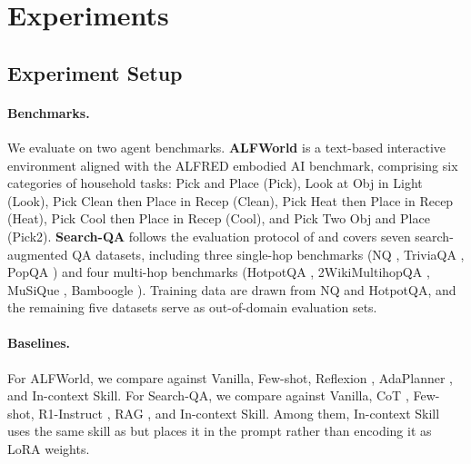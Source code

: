 \section{Experiments}

\subsection{Experiment Setup}
\paragraph{Benchmarks.}
We evaluate \method{} on two agent benchmarks. \textbf{ALFWorld} \citep{Shridhar2021ALFWorld} is a text-based interactive environment aligned with the ALFRED embodied AI benchmark, comprising six categories of household tasks: Pick and Place (Pick), Look at Obj in Light (Look), Pick Clean then Place in Recep (Clean), Pick Heat then Place in Recep (Heat), Pick Cool then Place in Recep (Cool), and Pick Two Obj and Place (Pick2). \textbf{Search-QA} follows the evaluation protocol of \citet{Jin2025SearchR1} and covers seven search-augmented QA datasets, including three single-hop benchmarks (NQ \citep{Kwiatkowski2019NQ}, TriviaQA \citep{Joshi2017TriviaQA}, PopQA \citep{Mallen2023PopQA}) and four multi-hop benchmarks (HotpotQA \citep{Yang2018HotpotQA}, 2WikiMultihopQA \citep{Ho2020Wiki}, MuSiQue \citep{Trivedi2022MuSiQue}, Bamboogle \citep{Press2023Bamboogle}). Training data are drawn from NQ and HotpotQA, and the remaining five datasets serve as out-of-domain evaluation sets.
 
\paragraph{Baselines.}
For ALFWorld, we compare against Vanilla, Few-shot, Reflexion \citep{Shinn2023Reflexion}, AdaPlanner \citep{Sun2023AdaPlanner}, and In-context Skill. For Search-QA, we compare against Vanilla, CoT \citep{Wei2022CoT}, Few-shot, R1-Instruct \citep{DeepSeek2025R1}, RAG \citep{Lewis2020RAG}, and In-context Skill. Among them, In-context Skill uses the same skill as \method{} but places it in the prompt rather than encoding it as LoRA weights.
 
